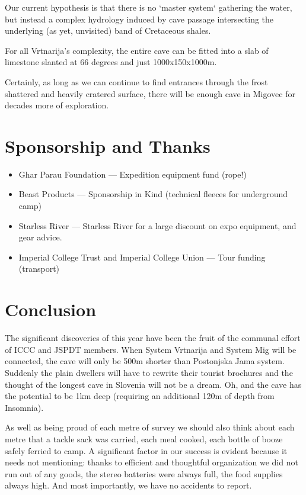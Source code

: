 Our current hypothesis is that there is no `master system` gathering the water,
but instead a complex hydrology induced by cave passage intersecting the
underlying (as yet, unvisited) band of Cretaceous shales.

For all Vrtnarija's complexity, the entire cave can be fitted into
a slab of limestone slanted at 66 degrees and just 1000x150x1000m.

Certainly, as long as we can continue to find entrances through the frost
shattered and heavily cratered surface, there will be enough cave in Migovec
for decades more of exploration.

\section{Sponsorship and Thanks}

\begin{itemize}
\item{Ghar Parau Foundation --- Expedition equipment fund (rope!)}
\item{Beast Products --- Sponsorship in Kind (technical fleeces for underground
camp)}
\item{Starless River --- Starless River for a large discount on expo equipment,
and gear advice.}
\item{Imperial College Trust and Imperial College Union --- Tour funding (transport) }
\end{itemize}

\section{Conclusion}

The significant discoveries of this year have been the fruit of the
communal effort of ICCC and JSPDT members. When System Vrtnarija and
System Mig will be connected, the cave will only be 500m shorter than
Postonjska Jama system. Suddenly the plain dwellers will have to rewrite
their tourist brochures and the thought of the longest cave in Slovenia
will not be a dream. Oh, and the cave has the potential to be 1km
deep (requiring an additional 120m of depth from Insomnia).

As well as being proud of each metre of survey we should also think
about each metre that a tackle sack was carried, each meal cooked,
each bottle of booze safely ferried to camp. A significant factor
in our success is evident because it needs not mentioning: thanks
to efficient and thoughtful organization we did not run out of any
goods, the stereo batteries were always full, the food supplies always
high. And most importantly, we have no accidents to report.

